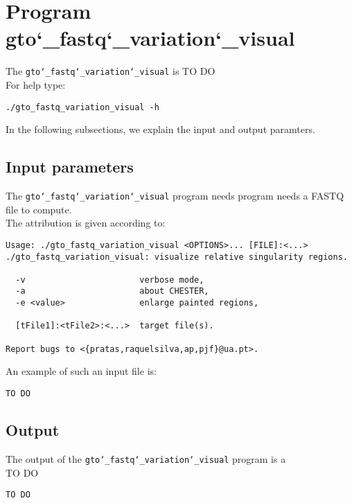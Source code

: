 \section{Program gto\char`_fastq\char`_variation\char`_visual}
The \texttt{gto\char`_fastq\char`_variation\char`_visual} is TO DO\\
For help type:
\begin{lstlisting}
./gto_fastq_variation_visual -h
\end{lstlisting}
In the following subsections, we explain the input and output paramters.

\subsection*{Input parameters}

The \texttt{gto\char`_fastq\char`_variation\char`_visual} program needs program needs a FASTQ file to compute.\\
The attribution is given according to:
\begin{lstlisting}
Usage: ./gto_fastq_variation_visual <OPTIONS>... [FILE]:<...>
./gto_fastq_variation_visual: visualize relative singularity regions.
                                                     
  -v                       verbose mode,             
  -a                       about CHESTER,            
  -e <value>               enlarge painted regions,  
                                                     
  [tFile1]:<tFile2>:<...>  target file(s).           
                                                     
Report bugs to <{pratas,raquelsilva,ap,pjf}@ua.pt>. 
\end{lstlisting}
An example of such an input file is:
\begin{lstlisting}
TO DO
\end{lstlisting}

\subsection*{Output}
The output of the \texttt{gto\char`_fastq\char`_variation\char`_visual} program is a \\
TO DO
\begin{lstlisting}
TO DO
\end{lstlisting}